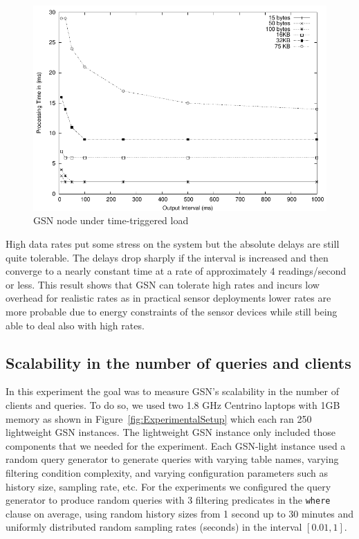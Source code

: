 \begin{figure}%
  \centering
  \includegraphics[width=0.8\columnwidth]{ch-gsn-figures/rates}
  \caption{GSN node under time-triggered load}
  \label{fig:TimeTriggeredLoad}
\end{figure}

High data rates put some stress on the system but the absolute delays are still
quite tolerable. The delays drop sharply if the interval is increased and then
converge to a nearly constant time at a rate of approximately 4 readings/second
or less. This result shows that GSN can tolerate high rates and incurs low
overhead for realistic rates as in practical sensor deployments lower rates are
more probable due to energy constraints of the sensor devices while still being
able to deal also with high rates.


\subsection{Scalability in the number of queries and clients}
\label{sec:scal-towards-numb}

In this experiment the goal was to measure GSN's scalability in the number of
clients and queries. To do so, we used two 1.8 GHz Centrino laptops with 1GB
memory as shown in Figure~\ref{fig:ExperimentalSetup} which each ran 250
lightweight GSN instances. The lightweight GSN instance only included those
components that we needed for the experiment. Each GSN-light instance used a
random query generator to generate queries with varying table names, varying
filtering condition complexity, and varying configuration parameters such as
history size, sampling rate, etc. For the experiments we configured the query
generator to produce random queries with 3 filtering predicates in the
\texttt{where} clause on average, using random history sizes from 1 second up
to 30 minutes and uniformly distributed random sampling rates (seconds) in the
interval $[0.01,1]$.

